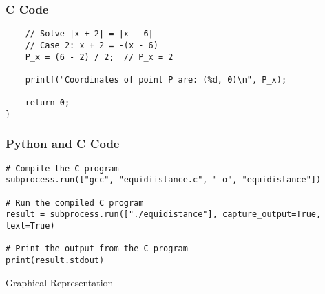 \documentclass{beamer}
\begin{document}
\begin{frame}[fragile]
\frametitle{C Code}
\begin{lstlisting}
    // Solve |x + 2| = |x - 6|
    // Case 2: x + 2 = -(x - 6)
    P_x = (6 - 2) / 2;  // P_x = 2

    printf("Coordinates of point P are: (%d, 0)\n", P_x);

    return 0;
}
\end{lstlisting}

\end{frame}

\begin{frame}[fragile]
\frametitle{Python and C Code}

\begin{lstlisting}
# Compile the C program
subprocess.run(["gcc", "equidiistance.c", "-o", "equidistance"])

# Run the compiled C program
result = subprocess.run(["./equidistance"], capture_output=True, text=True)

# Print the output from the C program 
print(result.stdout)
\end{lstlisting}

\end{frame}

\begin{frame}{Graphical Representation}
    

\begin{center}
\end{center}
\end{frame}
\end{document}
